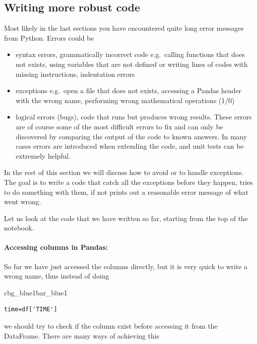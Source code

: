 \documentclass[%
oneside,                 %
final,                   %
10pt]{article}
\newenvironment{_pro_tight}[2]{
   \def\FrameCommand{\color{#2}\vrule width 1mm\normalcolor\colorbox{#1}}
   \FrameRule0.6pt\MakeFramed {\advance\hsize-2mm\FrameRestore}\vskip3mm}
   {\vskip0mm\endMakeFramed}
\newenvironment{pro}[2]{
\bgroup\rmfamily
\fboxsep=0mm\relax
\begin{_pro_tight}{#1}{#2}
\list{}{\parsep=-2mm\parskip=0mm\topsep=0pt\leftmargin=2mm
\rightmargin=2\leftmargin\leftmargin=4pt\relax}
\item\relax}
{\endlist\end{_pro_tight}\egroup}
\begin{document}
\subsection{Writing more robust code}
Most likely in the last sections you have encountered quite long error messages from Python. Errors could be
\begin{itemize}
\item syntax errors, grammatically incorrect code e.g.~calling functions that does not exists, using variables that are not defined or writing lines of codes with missing instructions, indentation errors 

\item exceptions e.g.~open a file that does not exists, accessing a Pandas header with the wrong name, performing wrong mathematical operations (1/0)

\item logical errors (bugs), code that runs but produces wrong results. These errors are of course some of the most difficult errors to fix and can only be discovered by comparing the output of the code to known answers. In many cases errors are introduced when extending the code, and unit tests can be extremely helpful.
\end{itemize}

\noindent
In the rest of this section we will discuss how to avoid or to handle exceptions. The goal is to write a code that catch all the exceptions before they happen, tries to do something with them, if not prints out a reasonable error message of what went wrong.

Let us look at the code that we have written so far, starting from the top of the notebook.

\paragraph{Accessing columns in Pandas:}
So far we have just accessed the columns directly, but it is very quick to write a wrong name, thus instead of doing


\begin{pro}{cbg_blue1}{bar_blue1}\begin{Verbatim}[numbers=none,fontsize=\fontsize{9pt}{9pt},baselinestretch=0.95,xleftmargin=2mm]
time=df['TIME']

\end{Verbatim}
\end{pro}
\noindent

we should try to check if the column exist before accessing it from the DataFrame. There are many ways of achieving this
\end{document}
